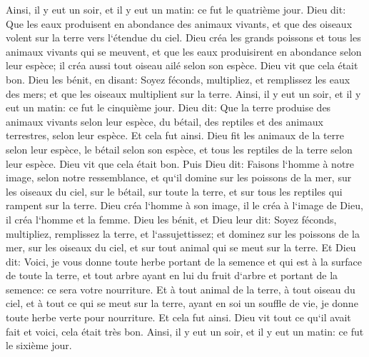 \verse Ainsi, il y eut un soir, et il y eut un matin: ce fut le quatrième jour. 
\verse Dieu dit: Que les eaux produisent en abondance des animaux vivants, et que des oiseaux volent sur la terre vers l`étendue du ciel. 
\verse Dieu créa les grands poissons et tous les animaux vivants qui se meuvent, et que les eaux produisirent en abondance selon leur espèce; il créa aussi tout oiseau ailé selon son espèce. Dieu vit que cela était bon. 
\verse Dieu les bénit, en disant: Soyez féconds, multipliez, et remplissez les eaux des mers; et que les oiseaux multiplient sur la terre. 
\verse Ainsi, il y eut un soir, et il y eut un matin: ce fut le cinquième jour. 
\verse Dieu dit: Que la terre produise des animaux vivants selon leur espèce, du bétail, des reptiles et des animaux terrestres, selon leur espèce. Et cela fut ainsi. 
\verse Dieu fit les animaux de la terre selon leur espèce, le bétail selon son espèce, et tous les reptiles de la terre selon leur espèce. Dieu vit que cela était bon. 
\verse Puis Dieu dit: Faisons l`homme à notre image, selon notre ressemblance, et qu`il domine sur les poissons de la mer, sur les oiseaux du ciel, sur le bétail, sur toute la terre, et sur tous les reptiles qui rampent sur la terre. 
\verse Dieu créa l`homme à son image, il le créa à l`image de Dieu, il créa l`homme et la femme. 
\verse Dieu les bénit, et Dieu leur dit: Soyez féconds, multipliez, remplissez la terre, et l`assujettissez; et dominez sur les poissons de la mer, sur les oiseaux du ciel, et sur tout animal qui se meut sur la terre. 
\verse Et Dieu dit: Voici, je vous donne toute herbe portant de la semence et qui est à la surface de toute la terre, et tout arbre ayant en lui du fruit d`arbre et portant de la semence: ce sera votre nourriture. 
\verse Et à tout animal de la terre, à tout oiseau du ciel, et à tout ce qui se meut sur la terre, ayant en soi un souffle de vie, je donne toute herbe verte pour nourriture. Et cela fut ainsi. 
\verse Dieu vit tout ce qu`il avait fait et voici, cela était très bon. Ainsi, il y eut un soir, et il y eut un matin: ce fut le sixième jour. 

